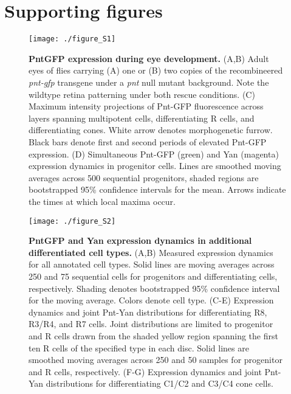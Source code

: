 \graphicspath{ {./figures/ratio/} }


\section{Supporting figures}

\begin{figure}[h]
\centering
\texttt{[image: ./figure\_S1]}
\caption[PntGFP expression during eye development.]{\textbf{PntGFP expression during eye development.} (A,B) Adult eyes of flies carrying (A) one or (B) two copies of the recombineered \textit{pnt-gfp} transgene under a \textit{pnt} null mutant background. Note the wildtype retina patterning under both rescue conditions. (C) Maximum intensity projections of Pnt-GFP fluorescence across layers spanning multipotent cells, differentiating R cells, and differentiating cones. White arrow denotes morphogenetic furrow. Black bars denote first and second periods of elevated Pnt-GFP expression. (D) Simultaneous Pnt-GFP (green) and Yan (magenta) expression dynamics in progenitor cells. Lines are smoothed moving averages across 500 sequential progenitors, shaded regions are bootstrapped 95\% confidence intervals for the mean. Arrows indicate the times at which local maxima occur.}
\label{fig:ratio:figS1}
\end{figure}

\begin{figure}[h]
\centering
\texttt{[image: ./figure\_S2]}
\caption[PntGFP and Yan expression dynamics in additional cell types.]{\textbf{PntGFP and Yan expression dynamics in additional differentiated cell types.} (A,B) Measured expression dynamics for all annotated cell types. Solid lines are moving averages across 250 and 75 sequential cells for progenitors and differentiating cells, respectively. Shading denotes bootstrapped 95\% confidence interval for the moving average. Colors denote cell type. (C-E) Expression dynamics and joint Pnt-Yan distributions for differentiating R8, R3/R4, and R7 cells. Joint distributions are limited to progenitor and R cells drawn from the shaded yellow region spanning the first ten R cells of the specified type in each disc. Solid lines are smoothed moving averages across 250 and 50 samples for progenitor and R cells, respectively. (F-G) Expression dynamics and joint Pnt-Yan distributions for differentiating C1/C2 and C3/C4 cone cells.}
\label{fig:ratio:figS2}
\end{figure}

